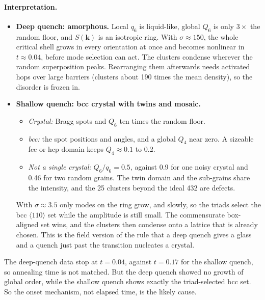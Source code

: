 \documentclass[11pt]{article}
\begin{document}
\paragraph{Interpretation.}
\begin{itemize}
  \item \textbf{Deep quench: amorphous.} Local $q_6$ is liquid-like, global
        $Q_6$ is only $3\times$ the random floor, and $S(\mathbf k)$ is an
        isotropic ring. With $\sigma\approx150$, the whole critical shell grows
        in every orientation at once and becomes nonlinear in $t\approx0.04$,
        before mode selection can act. The clusters condense wherever the
        random superposition peaks. Rearranging them afterwards needs
        activated hops over large barriers (clusters about 190 times the mean
        density), so the disorder is frozen in.
  \item \textbf{Shallow quench: bcc crystal with twins and mosaic.}
        \begin{itemize}
          \item \emph{Crystal:} Bragg spots and $Q_6$ ten times the random
                floor.
          \item \emph{bcc:} the spot positions and angles, and a global $Q_4$
                near zero. A sizeable fcc or hcp domain keeps $Q_4\approx0.1$
                to 0.2.
          \item \emph{Not a single crystal:} $Q_6/q_6=0.5$, against 0.9 for one
                noisy crystal and 0.46 for two random grains. The twin domain
                and the sub-grains share the intensity, and the 25 clusters
                beyond the ideal 432 are defects.
        \end{itemize}
        With $\sigma\approx3.5$ only modes on the ring grow, and slowly, so the
        triads select the bcc $\langle110\rangle$ set while the amplitude is
        still small. The commensurate box-aligned set wins, and the clusters
        then condense onto a lattice that is already chosen. This is the field
        version of the rule that a deep quench gives a glass and a quench just
        past the transition nucleates a crystal.
\end{itemize}
The deep-quench data stop at $t=0.04$, against $t=0.17$ for the shallow quench,
so annealing time is not matched. But the deep quench showed no growth of
global order, while the shallow quench shows exactly the triad-selected bcc
set. So the onset mechanism, not elapsed time, is the likely cause.
\end{document}
